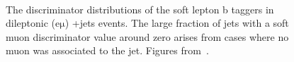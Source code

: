 \begin{figure}
\begin{centering}
 \\
\caption[The soft lepton b discriminator distributions]{The discriminator distributions of the soft lepton b taggers in dileptonic ($\mathrm{e\mu}$) \ttbar+jets events. The large fraction of jets with a soft muon discriminator value around zero arises from cases where no muon was associated to the jet. Figures from~\cite{CMS-PAS-BTV-15-001}.}
\label{fig:btag_softlep}
\end{centering}
\end{figure}

